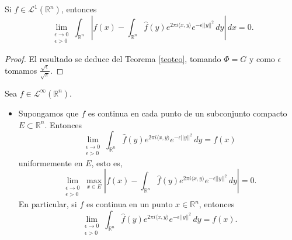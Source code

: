 \begin{corolario}
    Si $f \in \mathscr{L}^1(\mathbb{R}^n)$, entonces
    \begin{equation}
        \lim_{\substack{\epsilon \rightarrow 0 \\ \epsilon > 0}} \int_{\mathbb{R}^n} \left| f(x) -   \int_{\mathbb{R}^n}\widehat{f}(y)e^{2\pi i \langle x, y \rangle} e^{-\epsilon ||y||^2} \, dy \right| \, dx = 0.
    \end{equation}
\end{corolario}
\begin{proof}
    El resultado se deduce del Teorema \ref{teoteo}, tomando $\Phi = G$ y como $\epsilon$ tomamos $\frac{\sqrt{\epsilon}}{\sqrt{\pi}}$.
\end{proof}


\begin{teorema}

    Sea $f \in \mathscr{L}^{\infty}(\mathbb{R}^n)$.
    \begin{itemize}
        \item Supongamos que $f$ es continua en cada punto de un subconjunto compacto $E \subset \mathbb{R}^n$. Entonces
        \begin{equation}
             \lim_{\substack{\epsilon \rightarrow 0 \\ \epsilon >0}}\int_{\mathbb{R}^n}\widehat{f}(y)e^{2\pi i \langle x, y \rangle} e^{-\epsilon ||y||^2} \, dy  = f(x) 
        \end{equation}
        uniformemente en $E$, esto es, 
         \begin{equation}
        \lim_{\substack{\epsilon \rightarrow 0 \\ \epsilon > 0}} \max_{x \in E}  \left| f(x) -   \int_{\mathbb{R}^n}\widehat{f}(y)e^{2\pi i \langle x, y \rangle} e^{-\epsilon ||y||^2} \, dy \right|  = 0.
    \end{equation}
    En particular, si $f$ es continua en un punto $x \in \mathbb{R}^n$, entonces
    \begin{equation}
             \lim_{\substack{\epsilon \rightarrow 0 \\ \epsilon > 0}}\int_{\mathbb{R}^n}\widehat{f}(y)e^{2\pi i \langle x, y \rangle} e^{-\epsilon ||y||^2} \, dy  = f(x). 
        \end{equation}


\end{itemize}
\end{teorema}
